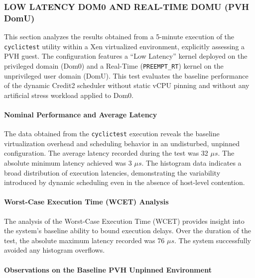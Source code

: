 \subsubsection{LOW LATENCY DOM0 AND REAL-TIME DOMU (PVH
DomU)}\label{low-latency-dom0-and-real-time-domu-pvh-domu}

This section analyzes the results obtained from a 5-minute execution of
the \texttt{cyclictest} utility within a Xen virtualized environment,
explicitly assessing a PVH guest. The configuration features a ``Low
Latency'' kernel deployed on the privileged domain (Dom0) and a
Real-Time (\texttt{PREEMPT\_RT}) kernel on the unprivileged user domain
(DomU). This test evaluates the baseline performance of the dynamic
Credit2 scheduler without static vCPU pinning and without any artificial
stress workload applied to Dom0.

\paragraph{Nominal Performance and Average
Latency}\label{nominal-performance-and-average-latency-24}

The data obtained from the \texttt{cyclictest} execution reveals the
baseline virtualization overhead and scheduling behavior in an
undisturbed, unpinned configuration. The average latency recorded during
the test was 32 $\mu s$. The absolute minimum latency achieved was 3 $\mu s$. The
histogram data indicates a broad distribution of execution latencies,
demonstrating the variability introduced by dynamic scheduling even in
the absence of host-level contention.

\paragraph{Worst-Case Execution Time (WCET)
Analysis}\label{worst-case-execution-time-wcet-analysis-26}

The analysis of the Worst-Case Execution Time (WCET) provides insight
into the system's baseline ability to bound execution delays. Over the
duration of the test, the absolute maximum latency recorded was 76 $\mu s$.
The system successfully avoided any histogram overflows.

\paragraph{Observations on the Baseline PVH Unpinned
Environment}\label{observations-on-the-baseline-pvh-unpinned-environment}

